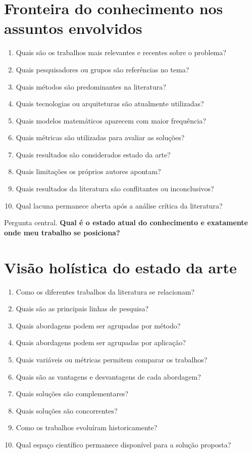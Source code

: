 \section{Fronteira do conhecimento nos assuntos envolvidos}

\begin{enumerate}
	\item Quais são os trabalhos mais relevantes e recentes sobre o problema?
	\item Quais pesquisadores ou grupos são referências no tema?
	\item Quais métodos são predominantes na literatura?
	\item Quais tecnologias ou arquiteturas são atualmente utilizadas?
	\item Quais modelos matemáticos aparecem com maior frequência?
	\item Quais métricas são utilizadas para avaliar as soluções?
	\item Quais resultados são considerados estado da arte?
	\item Quais limitações os próprios autores apontam?
	\item Quais resultados da literatura são conflitantes ou inconclusivos?
	\item Qual lacuna permanece aberta após a análise crítica da literatura?
\end{enumerate}

{Pergunta central.}
\textbf{Qual é o estado atual do conhecimento e exatamente onde meu trabalho se
	posiciona?}

\section{Visão holística do estado da arte}

\begin{enumerate}
	\item Como os diferentes trabalhos da literatura se relacionam?
	\item Quais são as principais linhas de pesquisa?
	\item Quais abordagens podem ser agrupadas por método?
	\item Quais abordagens podem ser agrupadas por aplicação?
	\item Quais variáveis ou métricas permitem comparar os trabalhos?
	\item Quais são as vantagens e desvantagens de cada abordagem?
	\item Quais soluções são complementares?
	\item Quais soluções são concorrentes?
	\item Como os trabalhos evoluíram historicamente?
	\item Qual espaço científico permanece disponível para a solução proposta?
\end{enumerate}


